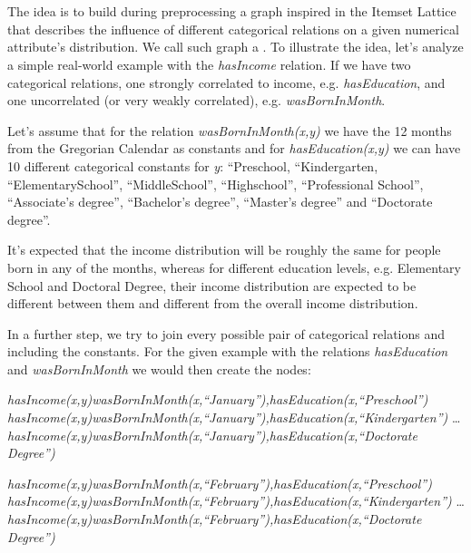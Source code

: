 \chapter{\graphname}
\label{ch:intro}

The idea is to build during preprocessing a graph inspired in the Itemset Lattice that describes the influence of different categorical relations on a given numerical attribute's distribution. We call such graph a \graphname.  To illustrate the idea, let's analyze a simple real-world example with the \emph{hasIncome} relation. If we have two categorical relations, one strongly correlated to income, e.g. \emph{hasEducation}, and one uncorrelated (or very weakly correlated), e.g. \emph{wasBornInMonth}.

Let's assume that for the relation \emph{wasBornInMonth(x,y)} we have the 12 months from the Gregorian Calendar as constants and for \emph{hasEducation(x,y)} we can have 10 different categorical constants for \emph{y}: ``Preschool, ``Kindergarten, ``ElementarySchool'', ``MiddleSchool'', ``Highschool'', ``Professional School'', ``Associate's degree'', ``Bachelor's degree'', ``Master's degree'' and ``Doctorate degree''. 

It's expected that the income distribution will be roughly the same for people born in any of the months, whereas for different education levels, e.g. Elementary School and Doctoral Degree, their income distribution are expected to be different between them and different from the overall income distribution.

In a further step, we try to join every possible pair of categorical relations and including the constants. For the given example with the relations \emph{hasEducation} and \emph{wasBornInMonth} we would then create the nodes:

  \emph{hasIncome(x,y)wasBornInMonth(x,``January''),hasEducation(x,``Preschool'')} \newline
  \emph{hasIncome(x,y)wasBornInMonth(x,``January''),hasEducation(x,``Kindergarten'')} \newline
  \dots \newline
  \emph{hasIncome(x,y)wasBornInMonth(x,``January''),hasEducation(x,``Doctorate Degree'')} \newline

  \emph{hasIncome(x,y)wasBornInMonth(x,``February''),hasEducation(x,``Preschool'')} \newline
  \emph{hasIncome(x,y)wasBornInMonth(x,``February''),hasEducation(x,``Kindergarten'')} \newline
  \dots \newline
  \emph{hasIncome(x,y)wasBornInMonth(x,``February''),hasEducation(x,``Doctorate Degree'')} \newline
 
